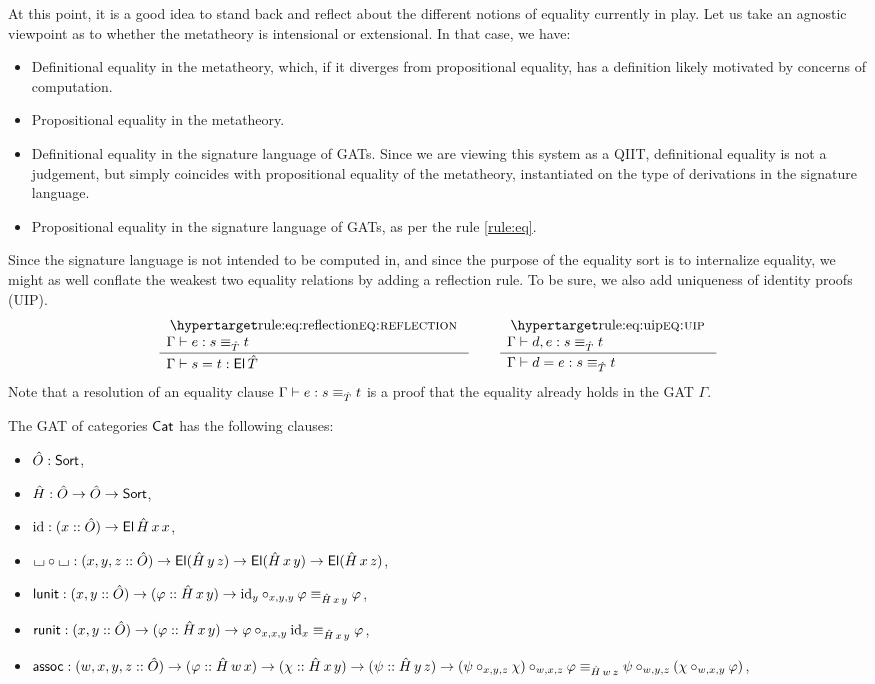\documentclass[a4paper]{article}
\begin{document}
At this point, it is a good idea to stand back and reflect about the different notions of equality currently in play.
Let us take an agnostic viewpoint as to whether the metatheory is intensional or extensional.
In that case, we have:
\begin{itemize}
	\item Definitional equality in the metatheory, which, if it diverges from propositional equality, has a definition likely motivated by concerns of computation.
	\item Propositional equality in the metatheory.
	\item Definitional equality in the signature language of GATs. Since we are viewing this system as a QIIT, definitional equality is not a judgement, but simply coincides with propositional equality of the metatheory, instantiated on the type of derivations in the signature language.
	\item Propositional equality in the signature language of GATs, as per the rule \ref{rule:eq}.
\end{itemize}
Since the signature language is not intended to be computed in, and since the purpose of the equality sort is to internalize equality, we might as well conflate the weakest two equality relations by adding a reflection rule.
To be sure, we also add uniqueness of identity proofs (UIP).
\[
	\inferencel{eq:reflection}{
		\Gamma \sez e : \idtp{\hat T} s t
	}{
		\Gamma \sez s = t : \El\,\hat T
	}{}
	\qquad
	\inferencel{eq:uip}{
		\Gamma \sez d, e : \idtp{\hat T} s t
	}{
		\Gamma \sez d = e : \idtp{\hat T} s t
	}{}
\]
Note that a resolution of an equality clause $\Gamma \sez e : \idtp{\hat T} s t$ is a proof that the equality already holds in the GAT $\Gamma$.
\begin{example}
	The GAT of categories $\Cat$ has the following clauses:
	\begin{itemize}[noitemsep]
		\item $\hat O : \Sort$,
		\item $\hat H : \hat O \to \hat O \to \Sort$,
		\item $\id : (x :: \hat O) \to \El\,\hat H\,x\,x$,
		\item $\loch \circ \loch : (x, y, z :: \hat O) \to \El(\hat H\,y\,z) \to \El(\hat H\,x\,y) \to \El(\hat H\,x\,z)$,
		\item $\name{lunit} : (x, y :: \hat O) \to (\vfi :: \hat H\,x\,y) \to \idtp{\hat H\,x\,y}{\id_y \circ_{x,y,y} \vfi}{\vfi}$,
		\item $\name{runit} : (x, y :: \hat O) \to (\vfi :: \hat H\,x\,y) \to \idtp{\hat H\,x\,y}{\vfi \circ_{x,x,y} \id_x}{\vfi}$,
		\item $\name{assoc} : (w, x, y, z :: \hat O) \to (\vfi :: \hat H\,w\,x) \to (\chi :: \hat H\,x\,y) \to (\psi :: \hat H\,y\,z) \to \idtp{\hat H\,w\,z}{(\psi \circ_{x,y,z} \chi) \circ_{w,x,z} \vfi}{\psi \circ_{w,y,z} (\chi \circ_{w,x,y} \vfi)}$,
	\end{itemize}
\end{example}
\end{document}
